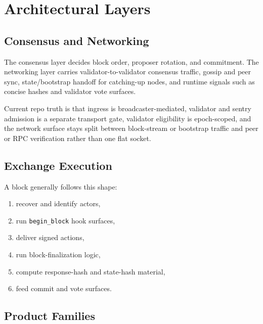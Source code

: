 \documentclass[11pt]{article}
\begin{document}
\section{Architectural Layers}

\subsection{Consensus and Networking}

The consensus layer decides block order, proposer rotation, and commitment. The
networking layer carries validator-to-validator consensus traffic, gossip and
peer sync, state/bootstrap handoff for catching-up nodes, and runtime signals
such as concise hashes and validator vote surfaces.

Current repo truth is that ingress is broadcaster-mediated, validator and
sentry admission is a separate transport gate, validator eligibility is
epoch-scoped, and the network surface stays split between block-stream or
bootstrap traffic and peer or RPC verification rather than one flat socket.

\subsection{Exchange Execution}

A block generally follows this shape:

\begin{enumerate}[leftmargin=1.4em]
  \item recover and identify actors,
  \item run \texttt{begin\_block} hook surfaces,
  \item deliver signed actions,
  \item run block-finalization logic,
  \item compute response-hash and state-hash material,
  \item feed commit and vote surfaces.
\end{enumerate}

\subsection{Product Families}
\end{document}
